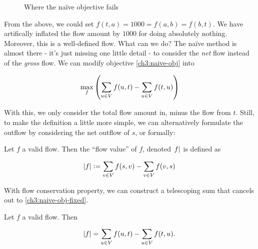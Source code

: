\begin{figure}[H]
    \centering
    \caption{Where the na\"ive objective fails }
\end{figure}

From the above, we could set $f(t,a)=1000=f(a,b)=f(b,t)$. 
We have artifically inflated the flow amount by $1000$ for doing absolutely nothing. 
Moreover, this is a well-defined flow. What can we do? The na\"ive method is almost there - it's just missing one little detail - to consider the \textit{net} flow instead of the \textit{gross} flow. 
We can modify objective \ref{ch3:naive-obj} into

\begin{equation}
    \label{ch3:naive-obj-fixed}
    \max_f \del{ \sum_{u\in V} f(u,t) - \sum_{u \in V} f(t,u) }
\end{equation}

With this, we only consider the total flow amount in, minus the flow from $t$. 
Still, to make the definition a little more simple, we can alternatively formulate the outflow by considering the net outflow of $s$, or formally:

\begin{define}
    Let $f$ a valid flow. 
    Then the ``flow value'' of $f$, denoted $\abs{f}$ is defined as 

    \begin{equation}
        \abs{f} := \sum_{v \in V} f(s,v) - \sum_{v \in V} f(v,s)
    \end{equation}
\end{define}

With flow conservation property, we can construct a telescoping sum that cancels out to \ref{ch3:naive-obj-fixed}. 

\begin{lemma}
    Let $f$ a valid flow. Then 

    \[
        \abs{f}=\sum_{u\in V} f(u,t) - \sum_{u \in V} f(t,u). 
    \]
\end{lemma}


